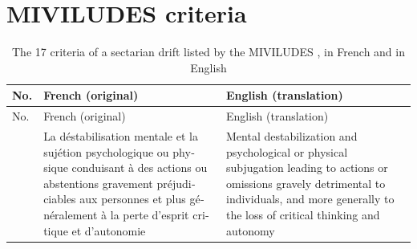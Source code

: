 \chapter{MIVILUDES criteria}
\label{app:miviludes_criteria}

{\footnotesize
	\begin{longtable}{@{}p{}p{}p{}@{}}
		\caption{The 17 criteria of a sectarian drift listed by the MIVILUDES \autocite{CommentIdentifierDerive}, in French and in English}\label{tab:miviludes_criteria}                                                                                                                                                                                                                                                                                                   \\
		\toprule No. & French (original)                                                                                                                                                                                                                             & English (translation)                                                                                                                                                                                 \\ \midrule \endfirsthead
		\toprule No. & French (original)                                                                                                                                                                                                                             & English (translation)                                                                                                                                                                                 \\ \midrule \endhead
		\bottomrule \endfoot
		1            & \foreignlanguage{french}{La déstabilisation mentale et la sujétion psychologique ou physique conduisant à des actions ou abstentions gravement préjudiciables aux personnes et plus généralement à la perte d'esprit critique et d'autonomie} & Mental destabilization and psychological or physical subjugation leading to actions or omissions gravely detrimental to individuals, and more generally to the loss of critical thinking and autonomy \\

\end{longtable}}
